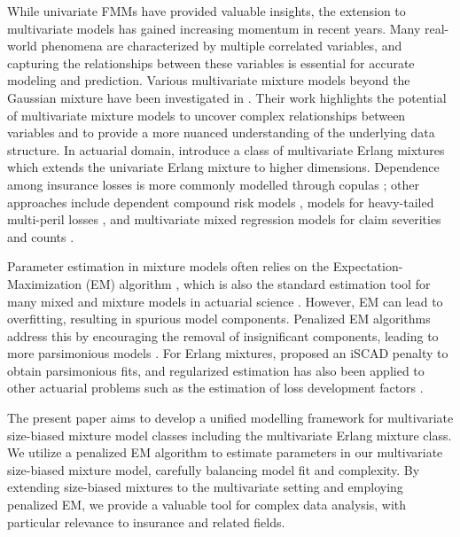 \documentclass[eng]{csam}
\begin{document}
While univariate FMMs have provided valuable insights, the extension to multivariate models has gained increasing momentum in recent years. Many real-world phenomena are characterized by multiple correlated variables, and capturing the relationships between these variables is essential for accurate modeling and prediction. Various multivariate mixture models beyond the Gaussian mixture have been investigated in \citet{Bouguila2020}. Their work highlights the potential of multivariate mixture models to uncover complex relationships between variables and to provide a more nuanced understanding of the underlying data structure. In actuarial domain, \citet{leelin2012} introduce a class of multivariate Erlang mixtures which extends the univariate Erlang mixture to higher dimensions. Dependence among insurance losses is more commonly modelled through copulas \citep{Frees1998, Klugman1999, jeong2020application, aradhye2024copula, ahn2026normal}; other approaches include dependent compound risk models \citep{jeong2020predictive}, models for heavy-tailed multi-peril losses \citep{yan2024dependence}, and multivariate mixed regression models for claim severities and counts \citep{chen2022em, jeong2023multivariate}.

Parameter estimation in mixture models often relies on the Expectation-Maximization (EM) algorithm \citep{dempster1977maximum}, which is also the standard estimation tool for many mixed and mixture models in actuarial science \citep{tzougas2020em, tzougas2021expectation, aradhye2024em}. However, EM can lead to overfitting, resulting in spurious model components. Penalized EM algorithms address this by encouraging the removal of insignificant components, leading to more parsimonious models \citep{Figueiredo}. For Erlang mixtures, \citet{yin2016efficient} proposed an iSCAD penalty to obtain parsimonious fits, and regularized estimation has also been applied to other actuarial problems such as the estimation of loss development factors \citep{jeong2021nonconvex}.

The present paper aims to develop a unified modelling framework for multivariate size-biased mixture model classes including the multivariate Erlang mixture class. We utilize a penalized EM algorithm to estimate parameters in our multivariate size-biased mixture model, carefully balancing model fit and complexity. By extending size-biased mixtures to the multivariate setting and employing penalized EM, we provide a valuable tool for complex data analysis, with particular relevance to insurance and related fields.
\end{document}
